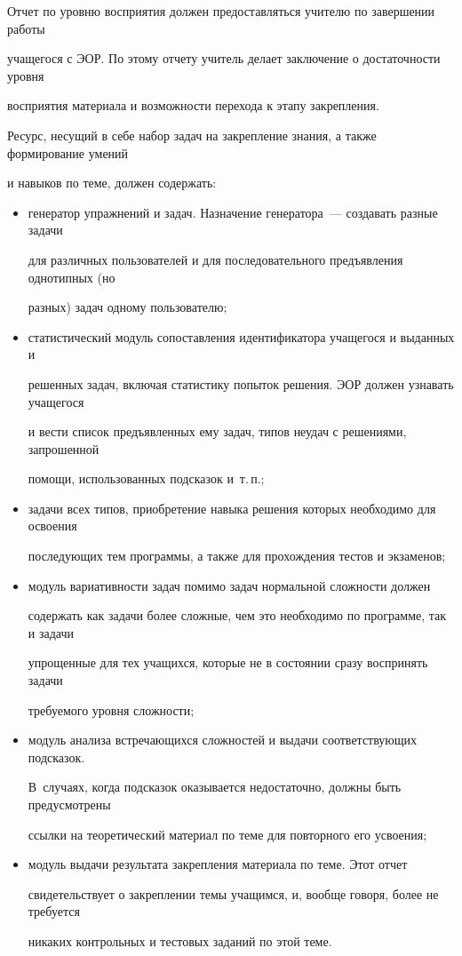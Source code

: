 Отчет по уровню восприятия должен предоставляться учителю по завершении работы 


учащегося с ЭОР. По этому отчету учитель делает заключение о достаточности уровня 


восприятия материала и возможности перехода к этапу закрепления.





Ресурс, несущий в себе набор задач на закрепление знания, а также формирование умений 


и навыков по теме, должен содержать:


\begin{itemize}


\item генератор упражнений и задач. Назначение генератора~--- создавать разные задачи 


для различных пользователей и для последовательного предъявления однотипных (но 


разных) задач одному пользователю;


\item статистический модуль сопоставления идентификатора учащегося и выданных и 


решенных задач, включая статистику попыток решения. ЭОР должен узнавать учащегося 


и вести список предъявленных ему задач, типов неудач с решениями, запрошенной 


помощи, использованных подсказок и~т.\,п.;


\item задачи всех типов, приобретение навыка решения которых необходимо для освоения 


последующих тем программы, а также для прохождения тестов и экзаменов;


\item модуль вариативности задач помимо задач нормальной сложности должен 


содержать как задачи более сложные, чем это необходимо по программе, так и задачи 


упрощенные для тех учащихся, которые не в состоянии сразу воспринять задачи 


требуемого уровня сложности;


\item модуль анализа встречающихся сложностей и выдачи соответствующих подсказок. 


В~случаях, когда подсказок оказывается недостаточно, должны быть предусмотрены 


ссылки на теоретический материал по теме для повторного его усвоения;


\item модуль выдачи результата закрепления материала по теме. Этот отчет 


свидетельствует о закреплении темы учащимся, и, вообще говоря, более не требуется 


никаких контрольных и тестовых заданий по этой теме.


\end{itemize}





